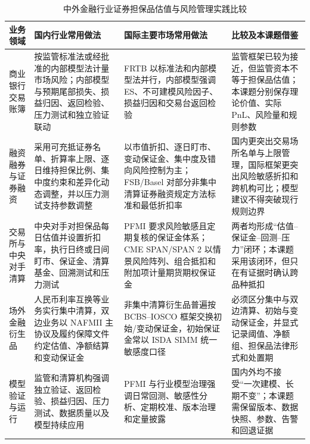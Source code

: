 \begin{table}[htbp]
  \centering
  \caption{中外金融行业证券担保品估值与风险管理实践比较}
  \label{tab:review-industry-practice-cn-intl}
  \ReportTableText
  \begin{tabularx}{\textwidth}{@{}p{6.5em}XXX@{}}
    \toprule
    业务领域 & 国内行业常用做法 & 国际主要市场常用做法 & 比较及本课题借鉴 \\
    \midrule
    商业银行交易账簿 & 按监管标准法或经批准的内部模型法计量市场风险；内部模型与预期尾部损失、损益归因、返回检验、压力测试和独立验证联动\cite{nfra_capital_2023,nfra_advanced_methods_2024} & FRTB 以标准法和内部模型法并行，内部模型强调 ES、不可建模风险因子、损益归因和交易台返回检验\cite{bcbs_2019_market_risk} & 监管框架已较为接近，但监管资本不等于担保品估值；本课题分别保存理论价值、实际 PnL、风险量和规则参数 \\
    融资融券与证券融资 & 采用可充抵证券名单、折算率上限、逐日维持担保比例、集中度约束和差异化动态调整，并以压力测试支持参数调整\cite{csrc_margin_financing_2015,sse_margin_rules_2023} & 以市值折扣、逐日盯市、变动保证金、集中度及错向风险控制为主；FSB/Basel 对部分非集中清算证券融资规定方法标准和最低折扣率\cite{fsb_sft_haircuts_2020,basel_sft_haircut_floors_2021,ecb_collateral_risk_control} & 国内更突出交易场所名单与上限管理，国际框架更突出风险敏感折扣和跨机构可比；模型建议不得突破现行规则边界 \\
    交易所与中央对手清算 & 中央对手对担保品每日估值并设置折扣率，执行日终或日间盯市、保证金、清算基金、回溯测试和压力测试\cite{shclearing_ccp_rules_2026,shclearing_pfmi_2024} & PFMI 要求风险敏感且定期复核的保证金体系；CME SPAN/SPAN 2 以情景风险阵列、组合抵扣和附加项计量期货期权保证金\cite{cpmi_iosco_pfmi_2012,cme_span_methodology} & 两者均形成“估值--保证金--回测--压力”闭环；本课题采用该闭环，但只在有证据时确认跨品种抵扣 \\
    场外金融衍生品 & 人民币利率互换等业务实行集中清算，双边业务以 NAFMII 主协议及履约保障文件约定估值、净额结算和变动保证金\cite{pbc_otc_clearing_2014,nafmii_vm_2025} & 非集中清算衍生品普遍按 BCBS--IOSCO 框架交换初始/变动保证金，初始保证金常以 ISDA SIMM 统一敏感度口径\cite{bcbs_iosco_margin_2015,isda_simm_2025} & 必须区分集中与双边清算、初始与变动保证金，并显式记录阈值、净额组、担保品法律形式和处置期 \\
    模型验证与运行 & 监管和清算机构强调独立验证、返回检验、损益归因、压力测试、数据质量以及模型持续应用\cite{nfra_advanced_methods_2024,shclearing_pfmi_2024} & PFMI 与行业模型治理强调日常回测、敏感性分析、定期校准、版本治理和定量披露\cite{cpmi_iosco_pfmi_2012,isda_simm_2025} & 国内外均不接受“一次建模、长期不变”；本课题需保留版本、数据快照、参数、告警和回退证据 \\
    \bottomrule
  \end{tabularx}
\end{table}

